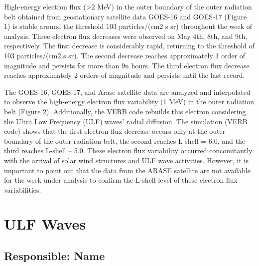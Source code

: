 \documentclass[a4paper, 10pt]{article}
\begin{document}
                     High-energy electron flux (>2 MeV) in the outer boundary of the outer radiation belt obtained from geostationary satellite data GOES-16 and GOES-17 (Figure 1) is stable around the threshold 103 particles/(cm2 s sr) throughout the week of analysis. Three electron flux decreases were observed on May 4th, 8th, and 9th, respectively. The first decrease is considerably rapid, returning to the threshold of 103 particles/(cm2 s sr). The second decrease reaches approximately 1 order of magnitude and persists for more than 9n hours. The third electron flux decrease reaches approximately 2 orders of magnitude and persists until the last record.    

The GOES-16, GOES-17, and Arase satellite data are analyzed and interpolated to observe the high-energy electron flux variability (1 MeV) in the outer radiation belt (Figure 2). Additionally, the VERB code rebuilds this electron considering the Ultra Low Frequency (ULF) waves' radial diffusion. The simulation (VERB code) shows that the first electron flux decrease occurs only at the outer boundary of the outer radiation belt, the second reaches L-shell = 6.0, and the third reaches L-shell – 5.0. These electron flux variability occurred concomitantly with the arrival of solar wind structures and ULF wave activities. However, it is important to point out that the data from the ARASE satellite are not available for the week under analysis to confirm the L-shell level of these electron flux variabilities.\section{ULF Waves} 
 \subsection{Responsible: Name} 
 
\end{document}

